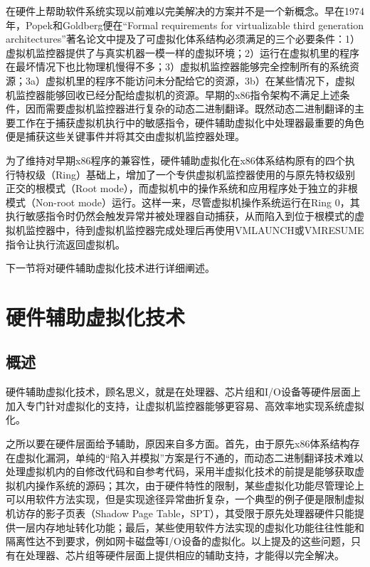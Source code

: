 在硬件上帮助软件系统实现以前难以完美解决的方案并不是一个新概念。早在1974年，Popek和Goldberg便在``Formal requirements for virtualizable third generation architectures''著名论文中提及了可虚拟化体系结构必须满足的三个必要条件：1）虚拟机监控器提供了与真实机器一模一样的虚拟环境；2）运行在虚拟机里的程序在最坏情况下也比物理机慢得不多；3）虚拟机监控器能够完全控制所有的系统资源；3a）虚拟机里的程序不能访问未分配给它的资源，3b）在某些情况下，虚拟机监控器能够回收已经分配给虚拟机的资源。早期的x86指令架构不满足上述条件，因而需要虚拟机监控器进行复杂的动态二进制翻译。既然动态二进制翻译的主要工作在于捕获虚拟机执行中的敏感指令，硬件辅助虚拟化中处理器最重要的角色便是捕获这些关键事件并将其交由虚拟机监控器处理。

为了维持对早期x86程序的兼容性，硬件辅助虚拟化在x86体系结构原有的四个执行特权级（Ring）基础上，增加了一个专供虚拟机监控器使用的与原先特权级别正交的根模式（Root mode），而虚拟机中的操作系统和应用程序处于独立的非根模式（Non-root mode）运行。这样一来，尽管虚拟机操作系统运行在Ring 0，其执行敏感指令时仍然会触发异常并被处理器自动捕获，从而陷入到位于根模式的虚拟机监控器中，待到虚拟机监控器完成处理后再使用VMLAUNCH或VMRESUME指令让执行流返回虚拟机。

下一节将对硬件辅助虚拟化技术进行详细阐述。

\section{硬件辅助虚拟化技术}

\subsection{概述}

硬件辅助虚拟化技术，顾名思义，就是在处理器、芯片组和I/O设备等硬件层面上加入专门针对虚拟化的支持，让虚拟机监控器能够更容易、高效率地实现系统虚拟化。

之所以要在硬件层面给予辅助，原因来自多方面。首先，由于原先x86体系结构存在虚拟化漏洞，单纯的``陷入并模拟''方案是行不通的，而动态二进制翻译技术难以处理虚拟机内的自修改代码和自参考代码，采用半虚拟化技术的前提是能够获取虚拟机内操作系统的源码；其次，由于硬件特性的限制，某些虚拟化功能尽管理论上可以用软件方法实现，但是实现途径异常曲折复杂，一个典型的例子便是限制虚拟机访存的影子页表（Shadow Page Table，SPT），其受限于原先处理器硬件只能提供一层内存地址转化功能；最后，某些使用软件方法实现的虚拟化功能往往性能和隔离性达不到要求，例如网卡磁盘等I/O设备的虚拟化。以上提及的这些问题，只有在处理器、芯片组等硬件层面上提供相应的辅助支持，才能得以完全解决。

